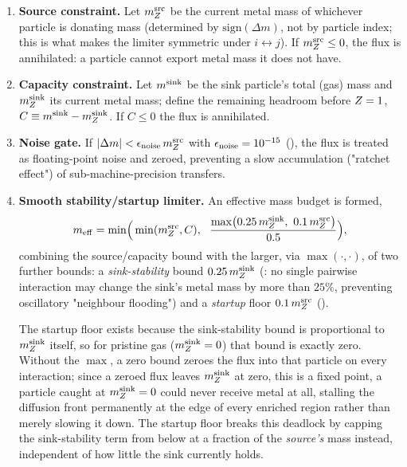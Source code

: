 \begin{enumerate}
  \item \textbf{Source constraint.} Let $m_{Z}^{\rm src}$ be the current
        metal mass of whichever particle is donating mass (determined
        by $\mathrm{sign}(\Delta m)$, not by particle index; this is
        what makes the limiter symmetric under $i\leftrightarrow j$). If
        $m_Z^{\rm src}\le 0$, the flux is annihilated: a particle cannot
        export metal mass it does not have.
  \item \textbf{Capacity constraint.} Let $m^{\rm sink}$ be the sink
        particle's total (gas) mass and $m_Z^{\rm sink}$ its current
        metal mass; define the remaining headroom before $Z=1$,
        $C \equiv m^{\rm sink} - m_Z^{\rm sink}$. If $C\le 0$ the flux is
        annihilated.
  \item \textbf{Noise gate.} If
        $|\Delta m| < \epsilon_{\rm noise}\, m_Z^{\rm src}$ with
        $\epsilon_{\rm noise}=10^{-15}$
        (), the flux is treated as
        floating-point noise and zeroed, preventing a slow
        accumulation ("ratchet effect") of sub-machine-precision
        transfers.
  \item \textbf{Smooth stability/startup limiter.} An effective mass
        budget is formed,
        \begin{equation}
          m_{\rm eff} = \min\!\Big(\min(m_Z^{\rm src}, C),\ \
          \frac{\max\!\big(0.25\, m_Z^{\rm sink},\ 0.1\, m_Z^{\rm src}\big)}{0.5}\Big) ,
        \end{equation}
        combining the source/capacity bound with the larger, via
        $\max(\cdot,\cdot)$, of two further bounds: a
        \emph{sink-stability} bound $0.25\, m_Z^{\rm sink}$
        (: no single
        pairwise interaction may change the sink's metal mass by more
        than $25\%$, preventing oscillatory "neighbour flooding") and a
        \emph{startup} floor $0.1\, m_Z^{\rm src}$
        ().

        The startup floor exists because the sink-stability bound is
        proportional to $m_Z^{\rm sink}$ itself, so for pristine gas
        ($m_Z^{\rm sink}=0$) that bound is exactly zero. Without the
        $\max$, a zero bound zeroes the flux into that particle on
        every interaction; since a zeroed flux leaves $m_Z^{\rm sink}$
        at zero, this is a fixed point, a particle caught at
        $m_Z^{\rm sink}=0$ could never receive metal at all, stalling
        the diffusion front permanently at the edge of every enriched
        region rather than merely slowing it down. The startup floor
        breaks this deadlock by capping the sink-stability term from
        below at a fraction of the \emph{source's} mass instead,
        independent of how little the sink currently holds.


\end{enumerate}
